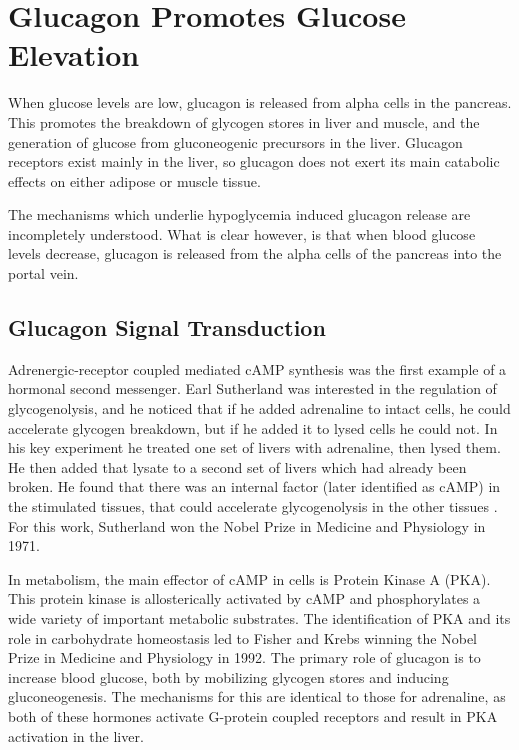 \documentclass{tufte-handout}
\begin{document}
\section{Glucagon Promotes Glucose Elevation}

 When glucose levels are low, glucagon is released from alpha cells in the pancreas.  This promotes the breakdown of glycogen stores in liver and muscle, and the generation of glucose from gluconeogenic precursors in the liver.  Glucagon receptors exist mainly in the liver, so glucagon does not exert its main catabolic effects on either adipose or muscle tissue. 

The mechanisms which underlie hypoglycemia induced glucagon release are incompletely understood.  What is clear however, is that when blood glucose levels decrease, glucagon is released from the alpha cells of the pancreas into the portal vein.

\subsection{Glucagon Signal Transduction}

Adrenergic-receptor coupled mediated cAMP synthesis was the first example of a hormonal second messenger.  Earl Sutherland was interested in the regulation of glycogenolysis, and he noticed that if he added adrenaline to intact cells, he could accelerate glycogen breakdown, but if he added it to lysed cells he could not.  In his key experiment he treated one set of livers with adrenaline, then lysed them.  He then added that lysate to a second set of livers which had already been broken.  He found that there was an internal factor (later identified as cAMP) in the stimulated tissues, that could accelerate glycogenolysis in the other tissues \citep{Rall1956}. For this work, Sutherland won the Nobel Prize in Medicine and Physiology in 1971.

In metabolism, the main effector of cAMP in cells is Protein Kinase A (PKA).  This protein kinase is allosterically activated by cAMP and phosphorylates a wide variety of important metabolic substrates.  The identification of PKA and its role in carbohydrate homeostasis led to Fisher and Krebs winning the Nobel Prize in Medicine and Physiology in 1992.  The primary role of glucagon is to increase blood glucose, both by mobilizing glycogen stores and inducing gluconeogenesis.  The mechanisms for this are identical to those for adrenaline, as both of these hormones activate G-protein coupled receptors  and result in PKA activation in the liver.
\end{document}
